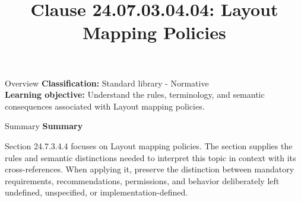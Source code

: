 \documentclass[10pt,letterpaper]{article}
\title{Clause 24.07.03.04.04: Layout Mapping Policies}
\author{}
\date{}
\begin{document}
\maketitle
\begin{CornellOverviewBox}{Overview}
\textbf{Classification:} Standard library - Normative\\[2pt]
\textbf{Learning objective:} Understand the rules, terminology, and semantic consequences associated with Layout mapping policies.
\end{CornellOverviewBox}\begin{CornellSummaryBox}{Summary}
{\sffamily\bfseries\color{Accent} Summary}\par\vspace{3pt}Section 24.7.3.4.4 focuses on Layout mapping policies. The section supplies the rules and semantic distinctions needed to interpret this topic in context with its cross-references. When applying it, preserve the distinction between mandatory requirements, recommendations, permissions, and behavior deliberately left undefined, unspecified, or implementation-defined.
\end{CornellSummaryBox}
\end{document}
